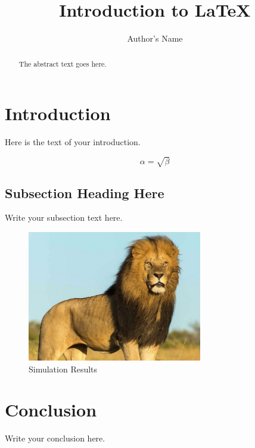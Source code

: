 \documentclass{article}
\begin{document}
\title{Introduction to \LaTeX{}}
\author{Author's Name}

\maketitle

\begin{abstract}
The abstract text goes here.
\end{abstract}

\section{Introduction}
Here is the text of your introduction.

\begin{equation}
	\label{simple_equation}
	\alpha = \sqrt{ \beta }
\end{equation}

\subsection{Subsection Heading Here}
Write your subsection text here.

\begin{figure}
	\centering
	\includegraphics[width=3.0in]{lion}
	\caption{Simulation Results}
	\label{simulationfigure}
\end{figure}

\section{Conclusion}
	Write your conclusion here.
\end{document}
